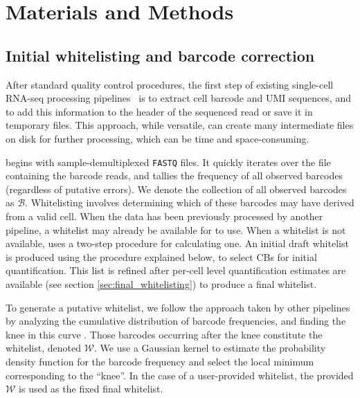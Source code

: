 \section{Materials and Methods}

\subsection{Initial whitelisting and barcode correction}
\label{sec:cell_barcoding}

After standard quality control procedures, the first step of existing single-cell RNA-seq processing pipelines~\citep{dropseq, indrop, tenx} is to extract cell barcode and UMI sequences, and to add this information to the header of the sequenced read or save it in temporary files. This approach, while versatile, can create many intermediate files on disk for further processing, which can be time and space-consuming.

\Alevin begins with sample-demultiplexed \texttt{FASTQ} files. It quickly iterates over the file containing the barcode reads, and tallies the frequency of all observed barcodes (regardless of putative errors). We denote the collection of all observed barcodes as $\mathcal{B}$. Whitelisting involves determining which of these barcodes may have derived from a valid cell. When the data has been previously processed by another pipeline, a whitelist may already be available for \alevin to use. When a whitelist is not available, \alevin uses a two-step procedure for calculating one. An initial draft whitelist is produced using the procedure explained below, to select CBs for initial quantification. This list is refined after per-cell level quantification estimates are available (see section \ref{sec:final_whitelisting}) to produce a final whitelist.

To generate a putative whitelist, we follow the approach taken by other \dscrnaseq pipelines by analyzing the cumulative distribution of barcode frequencies, and finding the knee in this curve \citep{dropseq, indrop}. Those barcodes occurring after the knee constitute the whitelist, denoted $\mathcal{W}$. We use a Gaussian kernel to estimate the probability density function for the barcode frequency and select the local minimum corresponding to the ``knee''. In the case of a user-provided whitelist, the provided $\mathcal{W}$ is used as the fixed final whitelist.


